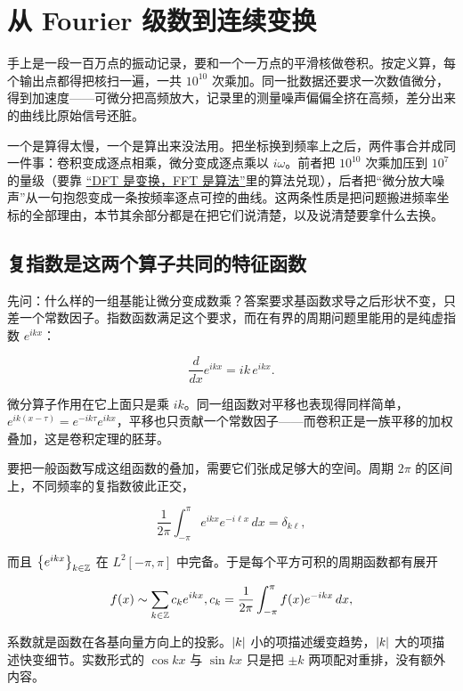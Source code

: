 \section{从 Fourier 级数到连续变换}
\label{sec:08-Numerical-Analysis/08-Fourier-and-Spectral-Methods/01}

手上是一段一百万点的振动记录，要和一个一万点的平滑核做卷积。按定义算，每个输出点都得把核扫一遍，一共 \(10^{10}\) 次乘加。同一批数据还要求一次数值微分，得到加速度——可微分把高频放大，记录里的测量噪声偏偏全挤在高频，差分出来的曲线比原始信号还脏。

一个是算得太慢，一个是算出来没法用。把坐标换到频率上之后，两件事合并成同一件事：卷积变成逐点相乘，微分变成逐点乘以 \(i\omega\)。前者把 \(10^{10}\) 次乘加压到 \(10^{7}\) 的量级（要靠 \hyperref[sec:08-Numerical-Analysis/08-Fourier-and-Spectral-Methods/03]{``DFT 是变换，FFT 是算法''}里的算法兑现），后者把``微分放大噪声''从一句抱怨变成一条按频率逐点可控的曲线。这两条性质是把问题搬进频率坐标的全部理由，本节其余部分都是在把它们说清楚，以及说清楚要拿什么去换。

\subsection{复指数是这两个算子共同的特征函数}

先问：什么样的一组基能让微分变成数乘？答案要求基函数求导之后形状不变，只差一个常数因子。指数函数满足这个要求，而在有界的周期问题里能用的是纯虚指数 \(e^{ikx}\)：

\[
\frac{d}{dx}e^{ikx}=ik\,e^{ikx}.
\]

微分算子作用在它上面只是乘 \(ik\)。同一组函数对平移也表现得同样简单，\(e^{ik(x-\tau)}=e^{-ik\tau}e^{ikx}\)，平移也只贡献一个常数因子——而卷积正是一族平移的加权叠加，这是卷积定理的胚芽。

要把一般函数写成这组函数的叠加，需要它们张成足够大的空间。周期 \(2\pi\) 的区间上，不同频率的复指数彼此正交，

\[
\frac{1}{2\pi}\int_{-\pi}^{\pi}e^{ikx}e^{-i\ell x}\,dx=\delta_{k\ell},
\]

而且 \(\left\{e^{ikx}\right\}_{k\in\mathbb{Z}}\) 在 \(L^2[-\pi,\pi]\) 中完备。于是每个平方可积的周期函数都有展开

\[
f(x)\sim\sum_{k\in\mathbb{Z}}c_k e^{ikx},
\space
c_k=\frac{1}{2\pi}\int_{-\pi}^{\pi}f(x)e^{-ikx}\,dx,
\]

系数就是函数在各基向量方向上的投影。\(\left|k\right|\) 小的项描述缓变趋势，\(\left|k\right|\) 大的项描述快变细节。实数形式的 \(\cos kx\) 与 \(\sin kx\) 只是把 \(\pm k\) 两项配对重排，没有额外内容。

